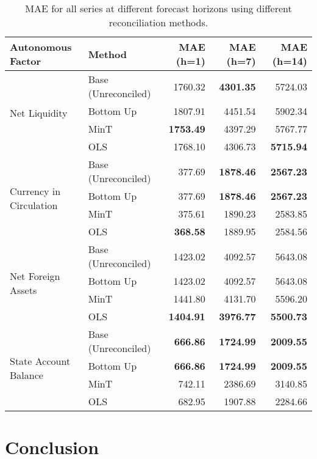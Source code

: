 \begin{table}[ht]
\centering
\begin{tabular}{l|l|rrr}
  \hline\hline
Autonomous Factor & Method & MAE (h=1) & MAE (h=7) & MAE (h=14) \\ 
  \hline
\multirow{4}{*}{Net Liquidity}&Base (Unreconciled) & 1760.32 & \textbf{4301.35} & 5724.03 \\ 
 & Bottom Up & 1807.91 & 4451.54 & 5902.34 \\ 
 & MinT & \textbf{1753.49} & 4397.29 & 5767.77 \\ 
  &OLS & 1768.10 & 4306.73 & \textbf{5715.94} \\ 
  \hline
\multirow{4}{*}{Currency in Circulation}  &Base (Unreconciled) & 377.69 & \textbf{1878.46} &\textbf{ 2567.23} \\ 
  &Bottom Up & 377.69 & \textbf{1878.46} & \textbf{2567.23 }\\ 
  &MinT & 375.61 & 1890.23 & 2583.85 \\ 
  &OLS & \textbf{368.58} & 1889.95 & 2584.56 \\ 
  \hline
\multirow{4}{*}{Net Foreign Assets}  &Base (Unreconciled) & 1423.02 & 4092.57 & 5643.08 \\ 
  &Bottom Up & 1423.02 & 4092.57 & 5643.08 \\ 
  &MinT & 1441.80 & 4131.70 & 5596.20 \\ 
  &OLS & \textbf{1404.91} & \textbf{3976.77} & \textbf{5500.73} \\ 
  \hline
\multirow{4}{*}{State Account Balance}  &Base (Unreconciled) & \textbf{666.86} &\textbf{ 1724.99} & \textbf{2009.55} \\ 
  &Bottom Up & \textbf{666.86} & \textbf{1724.99 }& \textbf{2009.55} \\ 
  &MinT & 742.11 & 2386.69 & 3140.85 \\ 
  &OLS & 682.95 & 1907.88 & 2284.66 \\ 
   \hline\hline
\end{tabular}
\caption{MAE for all series at different forecast horizons using different reconciliation methods.} 
\label{tab:reco}
\end{table}

\section{Conclusion}\label{sec:conc}

